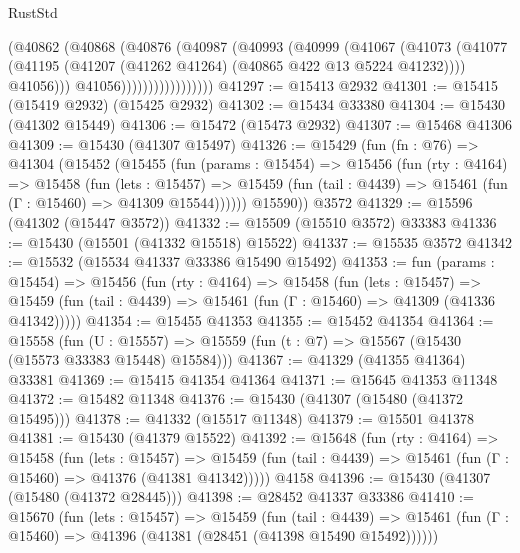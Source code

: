 \begin{lexlean}{RustStd}
\begin{coremodule}
{\begin{coremodule}
{{{{{{{{{{{{{{{{{{{{{{{{{{{{{{{{{{{{{{{{{{{{{{{{{{{{{{{{{{{{                            (@40862
                              (@40868
                                (@40876
                                  (@40987
                                    (@40993
                                      (@40999
                                        (@41067
                                          (@41073
                                            (@41077
                                              (@41195
                                                (@41207
                                                  (@41262 @41264)
                                                  (@40865 @422 @13 @5224 @41232))))
                                            @41056)))
                                      @41056)))))))))))))))))
@41297 := @15413 @2932
@41301 := @15415 (@15419 @2932) (@15425 @2932)
@41302 := @15434 @33380
@41304 := @15430 (@41302 @15449)
@41306 := @15472 (@15473 @2932)
@41307 := @15468 @41306
@41309 := @15430 (@41307 @15497)
@41326 := @15429
    (fun (fn : @76) =>
    @41304
      (@15452
        (@15455
          (fun (params : @15454) =>
          @15456
            (fun (rty : @4164) =>
            @15458
              (fun (lets : @15457) =>
              @15459 (fun (tail : @4439) => @15461 (fun (Γ : @15460) => @41309 @15544))))))
        @15590))
    @3572
@41329 := @15596 (@41302 (@15447 @3572))
@41332 := @15509 (@15510 @3572) @33383
@41336 := @15430 (@15501 (@41332 @15518) @15522)
@41337 := @15535 @3572
@41342 := @15532 (@15534 @41337 @33386 @15490 @15492)
@41353 := fun (params : @15454) =>
  @15456
    (fun (rty : @4164) =>
    @15458
      (fun (lets : @15457) =>
      @15459 (fun (tail : @4439) => @15461 (fun (Γ : @15460) => @41309 (@41336 @41342)))))
@41354 := @15455 @41353
@41355 := @15452 @41354
@41364 := @15558
    (fun (U : @15557) => @15559 (fun (t : @7) => @15567 (@15430 (@15573 @33383 @15448) @15584)))
@41367 := @41329 (@41355 @41364) @33381
@41369 := @15415 @41354 @41364
@41371 := @15645 @41353 @11348
@41372 := @15482 @11348
@41376 := @15430 (@41307 (@15480 (@41372 @15495)))
@41378 := @41332 (@15517 @11348)
@41379 := @15501 @41378
@41381 := @15430 (@41379 @15522)
@41392 := @15648
    (fun (rty : @4164) =>
    @15458
      (fun (lets : @15457) =>
      @15459 (fun (tail : @4439) => @15461 (fun (Γ : @15460) => @41376 (@41381 @41342)))))
    @4158
@41396 := @15430 (@41307 (@15480 (@41372 @28445)))
@41398 := @28452 @41337 @33386
@41410 := @15670
    (fun (lets : @15457) =>
    @15459
      (fun (tail : @4439) =>
      @15461 (fun (Γ : @15460) => @41396 (@41381 (@28451 (@41398 @15490 @15492))))))
}}}}}}}}}}}}}}}}}}}}}}}}}}}}}}}}}}}}}}}}}}}}}}}}}}}}}}}}}}}}
\end{coremodule}}
\end{coremodule}
\end{lexlean}

